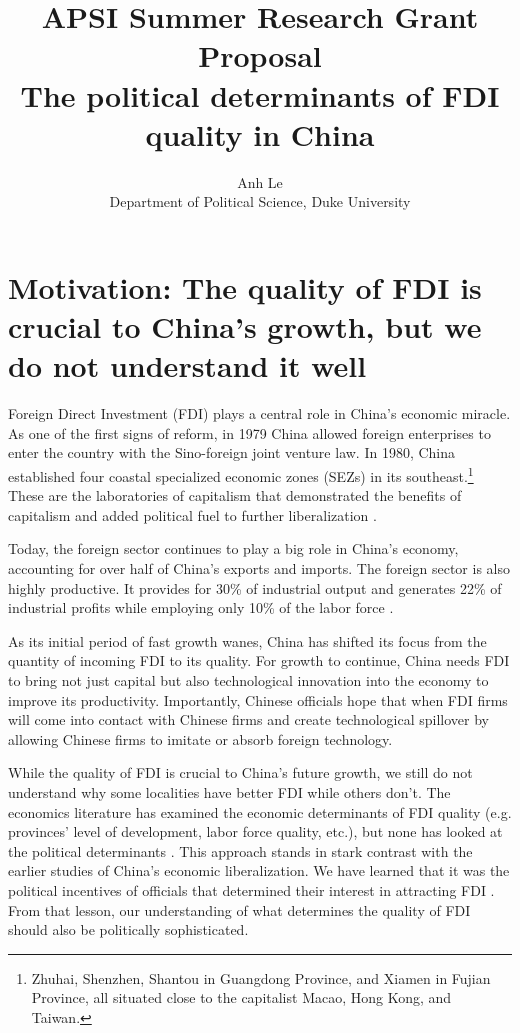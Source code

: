 \documentclass[12pt]{article}
\title{APSI Summer Research Grant Proposal\\
The political determinants of FDI quality in China}
\author{Anh Le \\
Department of Political Science, Duke University}
\begin{document}
\maketitle

\section{Motivation: The quality of FDI is crucial to China's growth, but we do not understand it well}

Foreign Direct Investment (FDI) plays a central role in China's economic miracle. As one of the first signs of reform, in 1979 China allowed foreign enterprises to enter the country with the Sino-foreign joint venture law. In 1980, China established four coastal specialized economic zones (SEZs) in its southeast.\footnote{Zhuhai, Shenzhen, Shantou in Guangdong Province, and Xiamen in Fujian Province, all situated close to the capitalist Macao, Hong Kong, and Taiwan.} These are the laboratories of capitalism that demonstrated the benefits of capitalism and added political fuel to further liberalization \citep[sec 1]{Gallagher2002}.

Today, the foreign sector continues to play a big role in China's economy, accounting for over half of China's exports and imports. The foreign sector is also highly productive. It provides for 30\% of industrial output and generates 22\% of industrial profits while employing only 10\% of the labor force \citep{WorldBank2010}.

As its initial period of fast growth wanes, China has shifted its focus from the quantity of incoming FDI to its quality. For growth to continue, China needs FDI to bring not just capital but also technological innovation into the economy to improve its productivity. Importantly, Chinese officials hope that when FDI firms will come into contact with Chinese firms and create technological spillover by allowing Chinese firms to imitate or absorb foreign technology.

While the quality of FDI is crucial to China's future growth, we still do not understand why some localities have better FDI while others don't. The economics literature has examined the economic determinants of FDI quality (e.g. provinces' level of development, labor force quality, etc.), but none has looked at the political determinants \citep{Wei2012, Cheung2004}. This approach stands in stark contrast with the earlier studies of China's economic liberalization. We have learned that it was the political incentives of officials that determined their interest in attracting FDI \citep{Shirk1993}. From that lesson, our understanding of what determines the quality of FDI should also be politically sophisticated.
\end{document}
